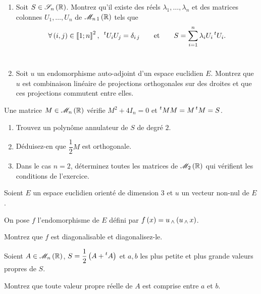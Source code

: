 \begin{exoss}
\begin{enumerate}
    \item Soit \(S\in\sym{n}[\R]\). Montrez qu'il existe des réels \(\lambda_1,\dots,\lambda_n\) et des matrices colonnes \(U_1,\dots,U_n\) de \(\M{n\,1}[\R]\) tels que \[\quantifs{\forall\paren{i,j}\in\interventierii{1}{n}^2}\trans{U_i}U_j=\delta_{i\,j}\qquad\text{et}\qquad S=\sum_{i=1}^n\lambda_iU_i\trans{U_i}.\] \\
    \item Soit \(u\) un endomorphisme auto-adjoint d'un espace euclidien \(E\). Montrez que \(u\) est combinaison linéaire de projections orthogonales sur des droites et que ces projections commutent entre elles.
\end{enumerate}
\end{exoss}

\begin{exoss}
Une matrice \(M\in\M{n}[\R]\) vérifie \(M^2+4I_n=0\) et \(\prescript{t}{}{M}M=M\prescript{t}{}{M}=S\).

\begin{enumerate}
    \item Trouvez un polynôme annulateur de \(S\) de degré \(2\). \\
    \item Déduisez-en que \(\dfrac{1}{2}M\) est orthogonale. \\
    \item Dans le cas \(n=2\), déterminez toutes les matrices de \(\M{2}[\R]\) qui vérifient les conditions de l'exercice.
\end{enumerate}
\end{exoss}

\begin{exoss}
Soient \(E\) un espace euclidien orienté de dimension \(3\) et \(u\) un vecteur non-nul de \(E\).

On pose \(f\) l'endomorphisme de \(E\) défini par \(f\left(x\right)=u\operatorname{_\wedge}\left(u\operatorname{_\wedge} x\right)\).

Montrez que \(f\) est diagonalisable et diagonalisez-le.
\end{exoss}

\begin{exoss}
Soient \(A\in\M{n}[\R]\), \(S=\dfrac{1}{2}\left(A+\prescript{t}{}{A}\right)\) et \(a,b\) les plus petite et plus grande valeurs propres de \(S\).

Montrez que toute valeur propre réelle de \(A\) est comprise entre \(a\) et \(b\).
\end{exoss}

